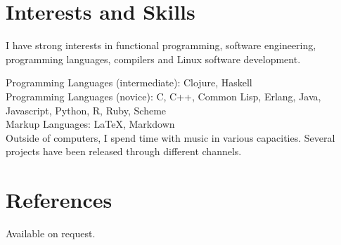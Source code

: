 \documentclass[margintitle,line]{res}
\begin{document}
\begin{resume}

\section{Interests and Skills}

I have strong interests in functional programming, software engineering, programming languages, compilers and Linux software development.

Programming Languages (intermediate): Clojure, Haskell \\
Programming Languages (novice): C, C++, Common Lisp, Erlang, Java, Javascript, Python, R, Ruby, Scheme \\
Markup Languages: LaTeX, Markdown \\

Outside of computers, I spend time with music in various capacities. Several projects have been released through different channels.


\section{References}

Available on request.

\end{resume}
\end{document}
